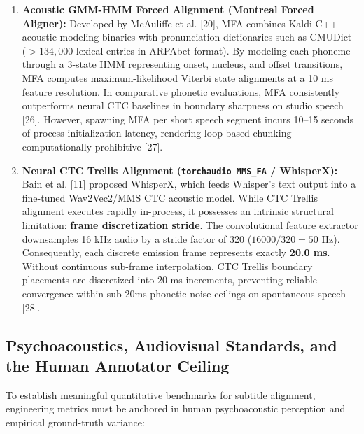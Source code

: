 \documentclass[12pt,a4paper]{article}
\begin{document}
\begin{enumerate}
    \item \textbf{Acoustic GMM-HMM Forced Alignment (Montreal Forced Aligner):} Developed by McAuliffe et al. [20], MFA combines Kaldi C++ acoustic modeling binaries with pronunciation dictionaries such as CMUDict ($>134,000$ lexical entries in ARPAbet format). By modeling each phoneme through a 3-state HMM representing onset, nucleus, and offset transitions, MFA computes maximum-likelihood Viterbi state alignments at a 10 ms feature resolution. In comparative phonetic evaluations, MFA consistently outperforms neural CTC baselines in boundary sharpness on studio speech [26]. However, spawning MFA per short speech segment incurs 10--15 seconds of process initialization latency, rendering loop-based chunking computationally prohibitive [27].
    \item \textbf{Neural CTC Trellis Alignment (\texttt{torchaudio MMS\_FA} / WhisperX):} Bain et al. [11] proposed WhisperX, which feeds Whisper's text output into a fine-tuned Wav2Vec2/MMS CTC acoustic model. While CTC Trellis alignment executes rapidly in-process, it possesses an intrinsic structural limitation: \textbf{frame discretization stride}. The convolutional feature extractor downsamples 16 kHz audio by a stride factor of 320 ($16000 / 320 = 50$ Hz). Consequently, each discrete emission frame represents exactly \textbf{20.0 ms}. Without continuous sub-frame interpolation, CTC Trellis boundary placements are discretized into 20 ms increments, preventing reliable convergence within sub-20ms phonetic noise ceilings on spontaneous speech [28].
\end{enumerate}

\subsection{Psychoacoustics, Audiovisual Standards, and the Human Annotator Ceiling}
To establish meaningful quantitative benchmarks for subtitle alignment, engineering metrics must be anchored in human psychoacoustic perception and empirical ground-truth variance:
\end{document}
